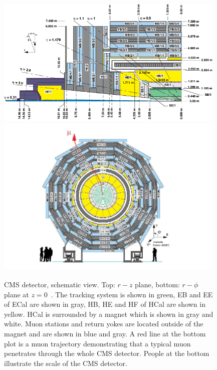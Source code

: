 \begin{figure}[htb]
  \begin{center}
    {\includegraphics[width=0.98\textwidth]{../figs/Exp/CMSview1.png}\\
     \includegraphics[width=0.98\textwidth]{../figs/Exp/CMSview.png}}
    \caption{CMS detector, schematic view. Top: $r-z$ plane, bottom: $r-\phi$ plane at $z=0$~\cite{ref_CMSschemView}. The tracking system is shown in green, EB and EE of ECal are shown in gray, HB, HE and HF of HCal are shown in yellow. HCal is surrounded by a magnet which is shown in gray and white. Muon stations and return yokes are located outside of the magnet and are shown in blue and gray. A red line at the bottom plot is a muon trajectory demonstrating that a typical muon penetrates through the whole CMS detector. People at the bottom illustrate the scale of the CMS detector.}
    \label{fig:CMSschemView}
  \end{center}
\end{figure}

